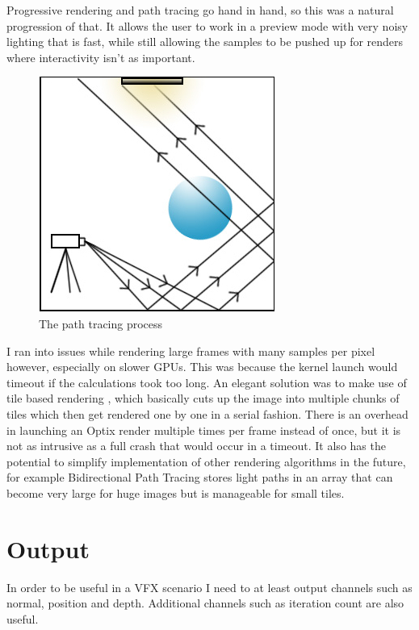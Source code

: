 \documentclass[11pt,a4paper,final,notitlepage]{report}
\begin{document}
Progressive rendering and path tracing go hand in hand, so this was a natural progression of that. It allows the user to work in a preview mode with very noisy lighting that is fast, while still allowing the samples to be pushed up for renders where interactivity isn't as important.


\begin{figure}
\begin{center}
\includegraphics[scale=0.5]{images/pathtracing}
\caption{The path tracing process}
\label{fig:path_tracing}
\end{center}
\end{figure}


I ran into issues while rendering large frames with many samples per pixel however, especially on slower GPUs. This was because the kernel launch would timeout if the calculations took too long. An elegant solution was to make use of tile based rendering \cite[pp. 51-52]{kalamp}, which basically cuts up the image into multiple chunks of tiles which then get rendered one by one in a serial fashion. There is an overhead in launching an Optix render multiple times per frame instead of once, but it is not as intrusive as a full crash that would occur in a timeout. It also has the potential to simplify implementation of other rendering algorithms in the future, for example Bidirectional Path Tracing stores light paths in an array that can become very large for huge images but is manageable for small tiles.

\section{Output}
In order to be useful in a VFX scenario I need to at least output channels such as normal, position and depth. Additional channels such as iteration count are also useful.
\end{document}
